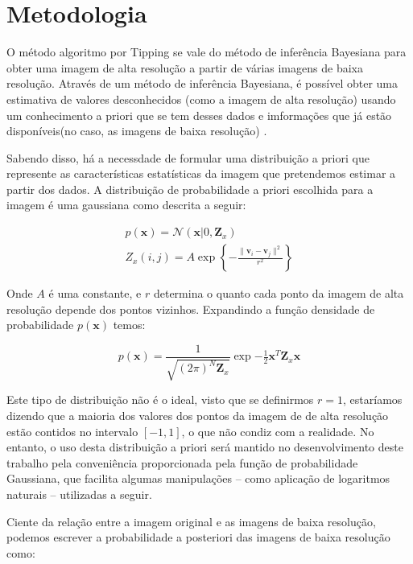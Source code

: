 \documentclass[12pt,openright,oneside,a4paper,english,brazil]{abntex2}
\begin{document}
\chapter{Metodologia}

O método algoritmo por Tipping se vale do método de inferência Bayesiana para obter uma imagem de alta resolução a partir de várias imagens de baixa resolução.
Através de um método de inferência Bayesiana, é possível obter uma estimativa de valores desconhecidos (como a imagem de alta resolução) usando um conhecimento a priori que se tem desses dados e imformações que já estão disponíveis(no caso, as imagens de baixa resolução) \cite{therrien2011probability}.

Sabendo disso, há a necessdade de formular uma distribuição a priori que represente as características estatísticas da imagem que pretendemos estimar a partir dos dados.
A distribuição de probabilidade a priori escolhida para a imagem é uma gaussiana como descrita a seguir:

\begin{gather}
	p(\mathbf{x}) = \mathcal{N}(\mathbf{x} | 0, \mathbf{Z}_x) \\ 
	Z_x(i,j) = A \exp \left\{ - \frac{\|\mathbf{v}_i - \mathbf{v}_j \|^2}{r^2} \right\}
\end{gather}

Onde $A$ é uma constante, e $r$ determina o quanto cada ponto da imagem de alta resolução depende dos pontos vizinhos.
Expandindo a função densidade de probabilidade $p(\mathbf{x})$ temos:

\begin{equation}
	p(\mathbf{x}) = \frac{1}{\sqrt{(2\pi)^N \mathbf{Z}_x}}\exp{-\tfrac{1}{2} \mathbf{x}^T \mathbf{Z}_x \mathbf{x}}
\end{equation}

Este tipo de distribuição não é o ideal, visto que se definirmos $r=1$, estaríamos dizendo que a maioria dos valores dos pontos da imagem de de alta resolução estão contidos no intervalo $[-1,1]$, o que não condiz com a realidade.
No entanto, o uso desta distribuição a priori será mantido no desenvolvimento deste trabalho pela conveniência proporcionada pela função de probabilidade Gaussiana, que facilita algumas manipulações -- como aplicação de logaritmos naturais --  utilizadas a seguir.

Ciente da relação entre a imagem original e as imagens de baixa resolução, podemos escrever a probabilidade a posteriori das imagens de baixa resolução como:
\end{document}
